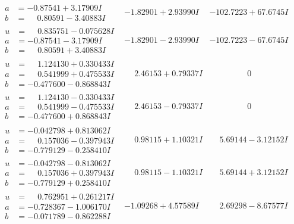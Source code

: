 \documentclass[1p]{elsarticle_modified}
\theoremstyle{definition}
\begin{document}
$$\begin{array}{c|c|c}
\begin{aligned}
a &= -0.87541 + 3.17909 I \\
b &= \phantom{-}0.80591 - 3.40883 I\end{aligned}
 & -1.82901 + 2.93990 I & -102.7223 + 67.6745 I \\ \hline\begin{aligned}
u &= \phantom{-}0.835751 - 0.075628 I \\
a &= -0.87541 - 3.17909 I \\
b &= \phantom{-}0.80591 + 3.40883 I\end{aligned}
 & -1.82901 - 2.93990 I & -102.7223 - 67.6745 I \\ \hline\begin{aligned}
u &= \phantom{-}1.124130 + 0.330433 I \\
a &= \phantom{-}0.541999 + 0.475533 I \\
b &= -0.477600 - 0.868843 I\end{aligned}
 & \phantom{-}2.46153 + 0.79337 I & \phantom{-0.000000 } 0 \\ \hline\begin{aligned}
u &= \phantom{-}1.124130 - 0.330433 I \\
a &= \phantom{-}0.541999 - 0.475533 I \\
b &= -0.477600 + 0.868843 I\end{aligned}
 & \phantom{-}2.46153 - 0.79337 I & \phantom{-0.000000 } 0 \\ \hline\begin{aligned}
u &= -0.042798 + 0.813062 I \\
a &= \phantom{-}0.157036 - 0.397943 I \\
b &= -0.779129 - 0.258410 I\end{aligned}
 & \phantom{-}0.98115 + 1.10321 I & \phantom{-}5.69144 - 3.12152 I \\ \hline\begin{aligned}
u &= -0.042798 - 0.813062 I \\
a &= \phantom{-}0.157036 + 0.397943 I \\
b &= -0.779129 + 0.258410 I\end{aligned}
 & \phantom{-}0.98115 - 1.10321 I & \phantom{-}5.69144 + 3.12152 I \\ \hline\begin{aligned}
u &= \phantom{-}0.762951 + 0.261217 I \\
a &= -0.728367 - 1.006170 I \\
b &= -0.071789 - 0.862288 I\end{aligned}
 & -1.09268 + 4.57589 I & \phantom{-}2.69298 - 8.67577 I \\ \hline\begin{aligned}

\end{aligned}
\end{array}$$
\end{document}
